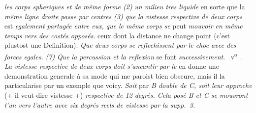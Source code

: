 %
\textit{les corps spheriques et de même forme (2)}
%
%
\textit{un milieu tres liquide} en sorte que la \textit{même ligne droite passe par}
%
%
\textit{centres (3) que la vistesse respective\protect{} de deux corps} est \textit{egalement partagée entre eux,}
%
%
\textit{que le même corps se} peut \textit{mouvoir en même temps vers des costés opposés}.
%
%
ceux dont la distance ne change point \textit{} (c'est plustost une Definition).
%
%
\textit{Que deux corps se reflechissent par le choc\protect{} avec des forces egales.}\protect{}
%
%
%
\textit{(7)}
%
\textit{Que la percussion\protect{} et la reflexion\protect{}}
%
se font
%
\textit{successivement}.
%
\pend
%
\pstart 
%
~v\textsuperscript{o}\rbrack\ \textit{. La vistesse respective\protect{} de deux corps}
%
%
\textit{doit s'aneantir par le}
%
%
en donne une demonstration generale à sa mode qui me paroist bien obscure, 
%
mais il la particularise par un exemple que voicy. 
%
\textit{Soit} par 
%
%
\textit{\textit{B} double de \textit{C}, soit leur approche} 
%
(+ il veut dire vistesse +) \textit{respective\protect{} de 12 degrés. 
%
Cela posé \textit{B} et \textit{C} se mouvront l'un vers l'autre avec six degrés reels de vistesse\protect{} par la supp.~3.}
